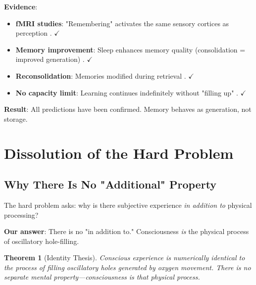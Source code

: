 \documentclass[11pt,a4paper]{article}
\newtheorem{theorem}{Theorem}
\begin{document}
\textbf{Evidence}:
\begin{itemize}
\item \textbf{fMRI studies}: "Remembering" activates the same sensory cortices as perception \cite{mechelli2004price}. $\checkmark$
\item \textbf{Memory improvement}: Sleep enhances memory quality (consolidation = improved generation) \cite{stickgold2005sleep}. $\checkmark$
\item \textbf{Reconsolidation}: Memories modified during retrieval \cite{nader2000reconsolidation}. $\checkmark$
\item \textbf{No capacity limit}: Learning continues indefinitely without "filling up" \cite{landauer1986memory}. $\checkmark$
\end{itemize}

\textbf{Result}: All predictions have been confirmed. Memory behaves as generation, not storage.

\section{Dissolution of the Hard Problem}

\subsection{Why There Is No "Additional" Property}

The hard problem asks: why is there subjective experience \textit{in addition to} physical processing?

\textbf{Our answer}: There is no "in addition to." Consciousness \textit{is} the physical process of oscillatory hole-filling.

\begin{theorem}[Identity Thesis]
\label{thm:identity}
Conscious experience is numerically identical to the process of filling oscillatory holes generated by oxygen movement. There is no separate mental property—consciousness is that physical process.
\end{theorem}
\end{document}
